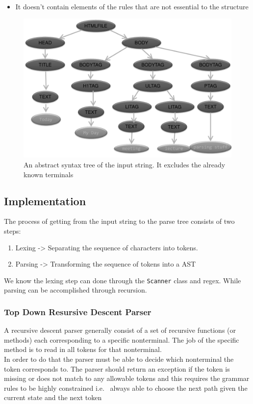 \documentclass[
]{book}
\providecommand{\tightlist}{%
  \setlength{\itemsep}{0pt}\setlength{\parskip}{0pt}}
\begin{document}
\begin{itemize}
\tightlist
\item
  It doesn't contain elements of the rules that are not essential to the structure
\end{itemize}

\begin{figure}
\includegraphics[width=0.6\linewidth,height=0.6\textheight]{img/09-image04} \caption{An abstract syntax tree of the input string. It excludes the already known terminals}\label{fig:syntax-tree}
\end{figure}

\hypertarget{implementation}{%
\subsection{Implementation}\label{implementation}}

The process of getting from the input string to the parse tree consists of two steps:

\begin{enumerate}
\def\labelenumi{\arabic{enumi}.}
\tightlist
\item
  Lexing -\textgreater{} Separating the sequence of characters into tokens.
\item
  Parsing -\textgreater{} Transforming the sequence of tokens into a AST
\end{enumerate}

We know the lexing step can done through the \texttt{Scanner} class and regex. While parsing can be accomplished through recursion.

\hypertarget{top-down-resursive-descent-parser}{%
\subsubsection{Top Down Resursive Descent Parser}\label{top-down-resursive-descent-parser}}

A recursive descent parser generally consist of a set of recursive functions (or methods) each corresponding to a specific nonterminal. The job of the specific method is to read in all tokens for that nonterminal.\\
In order to do that the parser must be able to decide which nonterminal the token corresponds to. The parser should return an exception if the token is missing or does not match to any allowable tokens and this requires the grammar rules to be highly constrained i.e.~{ always able to choose the next path given the current state and the next token}
\end{document}
